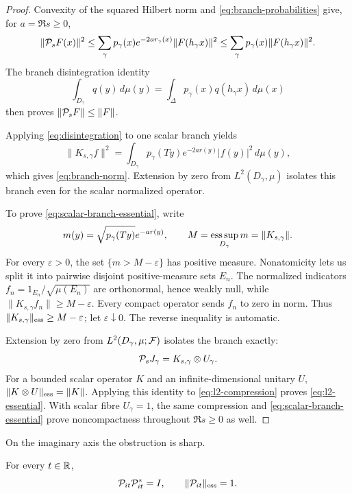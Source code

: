 \begin{proof}
Convexity of the squared Hilbert norm and
\eqref{eq:branch-probabilities} give, for \(a=\Re s\ge0\),
\[
 \|\mathcal P_sF(x)\|^2
 \le\sum_\gamma p_\gamma(x)e^{-2ar_\gamma(x)}
     \|F(h_\gamma x)\|^2
 \le\sum_\gamma p_\gamma(x)\|F(h_\gamma x)\|^2.
\]
The branch disintegration identity
\begin{equation}
 \int_{D_\gamma}q(y)\,d\mu(y)
 =\int_\Delta p_\gamma(x)q(h_\gamma x)\,d\mu(x)
 \label{eq:disintegration}
\end{equation}
then proves \(\|\mathcal P_sF\|\le\|F\|\).

Applying \eqref{eq:disintegration} to one scalar branch yields
\[
 \|K_{s,\gamma}f\|^2
 =\int_{D_\gamma}p_\gamma(Ty)e^{-2ar(y)}|f(y)|^2\,d\mu(y),
\]
which gives \eqref{eq:branch-norm}.  Extension by zero from
\(L^2(D_\gamma,\mu)\) isolates this branch even for the scalar normalized
operator.

To prove \eqref{eq:scalar-branch-essential}, write
\[
 m(y)=\sqrt{p_\gamma(Ty)}e^{-ar(y)},\qquad
 M=\operatorname*{ess\,sup}_{D_\gamma}m=\|K_{s,\gamma}\|.
\]
For every \(\varepsilon>0\), the set
\(\{m>M-\varepsilon\}\) has positive measure.  Nonatomicity lets us split
it into pairwise disjoint positive-measure sets \(E_n\).  The normalized
indicators \(f_n=1_{E_n}/\sqrt{\mu(E_n)}\) are orthonormal, hence weakly
null, while \(\|K_{s,\gamma}f_n\|\ge M-\varepsilon\).  Every compact
operator sends \(f_n\) to zero in norm.  Thus
\(\|K_{s,\gamma}\|_{\mathrm{ess}}\ge M-\varepsilon\); let
\(\varepsilon\downarrow0\).  The reverse inequality is automatic.

Extension by zero from
\(L^2(D_\gamma,\mu;\mathcal F)\) isolates the branch exactly:
\begin{equation}
 \mathcal P_sJ_\gamma=K_{s,\gamma}\otimes U_\gamma.
 \label{eq:l2-compression}
\end{equation}
For a bounded scalar operator \(K\) and an infinite-dimensional unitary
\(U\), \(\|K\otimes U\|_{\mathrm{ess}}=\|K\|\).  Applying this identity to
\eqref{eq:l2-compression} proves \eqref{eq:l2-essential}.
With scalar fibre \(U_\gamma=1\), the same compression and
\eqref{eq:scalar-branch-essential} prove noncompactness throughout
\(\Re s\ge0\) as well.
\end{proof}

On the imaginary axis the obstruction is sharp.

\begin{theorem}[Coisometry]
\label{thm:coisometry}
For every \(t\in\mathbb R\),
\begin{equation}
 \mathcal P_{it}\mathcal P_{it}^*=I,
 \qquad
 \|\mathcal P_{it}\|_{\mathrm{ess}}=1.
 \label{eq:coisometry}
\end{equation}
\end{theorem}

